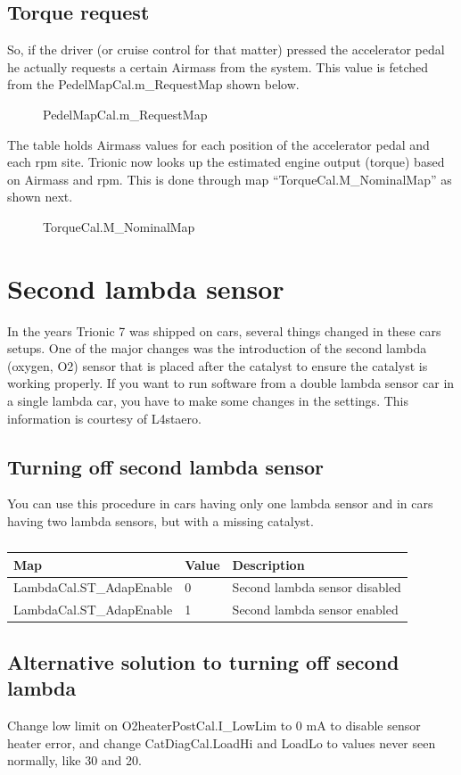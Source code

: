 \documentclass[11pt,a4paper]{book}
\newcommand{\Mfig}[1]{%
\begin{figure}[<+htpb+>]
    \centering
    \missingfigure{}
    \caption{#1}
\end{figure}}
\begin{document}
\subsection{Torque request}
So, if the driver (or cruise control for that matter) pressed the accelerator pedal he actually requests a
certain Airmass from the system. This value is fetched from the PedelMapCal.m\_RequestMap shown
below.
\Mfig{PedelMapCal.m\_RequestMap}

The table holds Airmass values for each position of the accelerator pedal and each rpm site. Trionic
now looks up the estimated engine output (torque) based on Airmass and rpm. This is done through
map \enquote{TorqueCal.M\_NominalMap} as shown next.

\Mfig{TorqueCal.M\_NominalMap}

\section{Second lambda sensor}
In the years Trionic 7 was shipped on cars, several things changed in these cars setups. One of the
major changes was the introduction of the second lambda (oxygen, O2) sensor that is placed after the
catalyst to ensure the catalyst is working properly. If you want to run software from a double lambda
sensor car in a single lambda car, you have to make some changes in the settings. This information is
courtesy of L4staero.

\subsection{Turning off second lambda sensor}
You can use this procedure in cars having only one lambda sensor and in cars having two lambda
sensors, but with a missing catalyst.

\begin{table}
    \centering
    \begin{tabular}{lll}
Map & Value& Description \\
\midrule
LambdaCal.ST\_AdapEnable & 0 &Second lambda sensor disabled \\
LambdaCal.ST\_AdapEnable & 1& Second lambda sensor enabled \\
    \end{tabular}
    \caption{}
    \label{tab:}
\end{table}

\subsection{Alternative solution to turning off second lambda}
Change low limit on O2heaterPostCal.I\_LowLim to 0 mA to disable sensor heater error, and change
CatDiagCal.LoadHi and LoadLo to values never seen normally, like 30 and 20.
\end{document}
